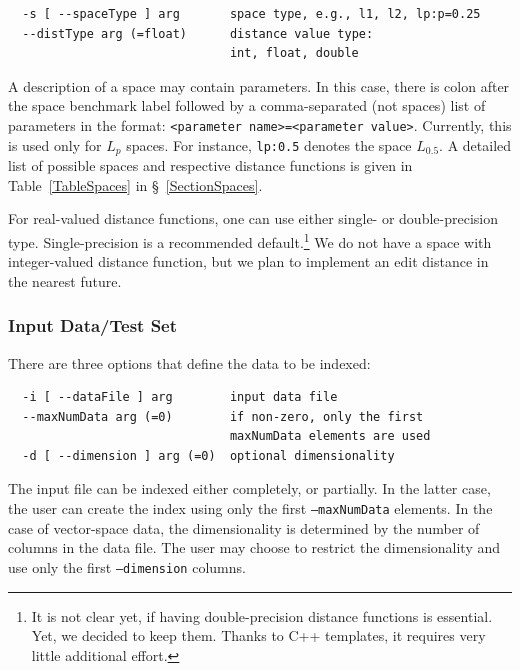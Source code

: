 \documentclass[runningheads,a4paper]{llncs}
\newcommand{\ttt}[1]{\texttt{#1}}
\begin{document}
{\begin{verbatim}
  -s [ --spaceType ] arg       space type, e.g., l1, l2, lp:p=0.25
  --distType arg (=float)      distance value type: 
                               int, float, double
\end{verbatim}

A description of a space may contain parameters.
In this case, there is colon after the space benchmark label followed by a
comma-separated (not spaces) list of parameters in the format:
\ttt{<parameter name>=<parameter value>}.
Currently, this is used only for $L_p$ spaces. For instance,
 \ttt{lp:0.5} denotes the space $L_{0.5}$.
A detailed list of possible spaces and respective
distance functions is given in Table~\ref{TableSpaces} in \S~\ref{SectionSpaces}.

For real-valued distance functions, one can use either single- or double-precision
type. Single-precision is a recommended default.\footnote{It is not clear yet,
if having double-precision distance functions is essential. Yet, we decided
to keep them. Thanks to C++ templates, it requires very little additional effort.}
We do not have a space with integer-valued distance function, but we
plan to implement an edit distance in the nearest future.

\subsubsection{Input Data/Test Set}
There are three options that define the data to be indexed:
\begin{verbatim}
  -i [ --dataFile ] arg        input data file
  --maxNumData arg (=0)        if non-zero, only the first 
                               maxNumData elements are used
  -d [ --dimension ] arg (=0)  optional dimensionality
\end{verbatim}
The input file can be indexed either completely, or partially.
In the latter case, the user can create the index using only
the first \ttt{--maxNumData} elements.
In the case of vector-space data, the dimensionality is determined
by the number of columns in the data file.
The user may choose to restrict the dimensionality and use only the first 
\ttt{--dimension} columns.

}
\end{document}
